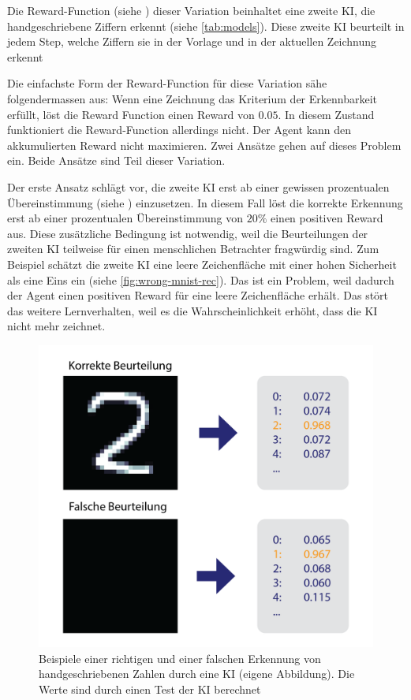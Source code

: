 Die Reward-Function (siehe ) dieser Variation beinhaltet
eine zweite KI, die handgeschriebene Ziffern erkennt (siehe
\autoref{tab:models}). Diese zweite KI beurteilt in jedem Step, welche
Ziffern sie in der Vorlage und in der aktuellen
Zeichnung erkennt
 
Die einfachste Form der Reward-Function für diese Variation sähe
folgendermassen aus: Wenn eine Zeichnung das Kriterium der Erkennbarkeit
erfüllt, löst die Reward Function einen Reward von $0.05$. In diesem Zustand
funktioniert die Reward-Function allerdings nicht. Der Agent kann den
akkumulierten Reward nicht maximieren. Zwei Ansätze gehen auf dieses Problem
ein. Beide Ansätze sind Teil dieser Variation.
 
Der erste Ansatz schlägt vor, die zweite KI erst ab einer gewissen prozentualen
Übereinstimmung (siehe ) einzusetzen. In diesem Fall
löst die korrekte Erkennung erst ab einer prozentualen Übereinstimmung von
$20\%$ einen positiven Reward aus. Diese zusätzliche Bedingung ist notwendig,
weil die Beurteilungen der zweiten KI teilweise für einen menschlichen
Betrachter fragwürdig sind. Zum Beispiel schätzt die zweite KI eine leere
Zeichenfläche mit einer hohen Sicherheit als eine Eins ein (siehe
\autoref{fig:wrong-mnist-rec}). Das ist ein Problem, weil dadurch der Agent
einen positiven Reward für eine leere Zeichenfläche erhält. Das stört das
weitere Lernverhalten, weil es die Wahrscheinlichkeit erhöht, dass die KI nicht
mehr zeichnet.
 
\begin{figure}[!ht]
 \centering
 \includegraphics[width=\textwidth-2cm]{images/methode/wrong-mnist-rec.png}
 \caption{Beispiele einer richtigen und einer falschen Erkennung von handgeschriebenen Zahlen durch eine KI (eigene Abbildung). Die Werte sind durch einen Test der KI berechnet}\label{fig:wrong-mnist-rec}
\end{figure}
 
